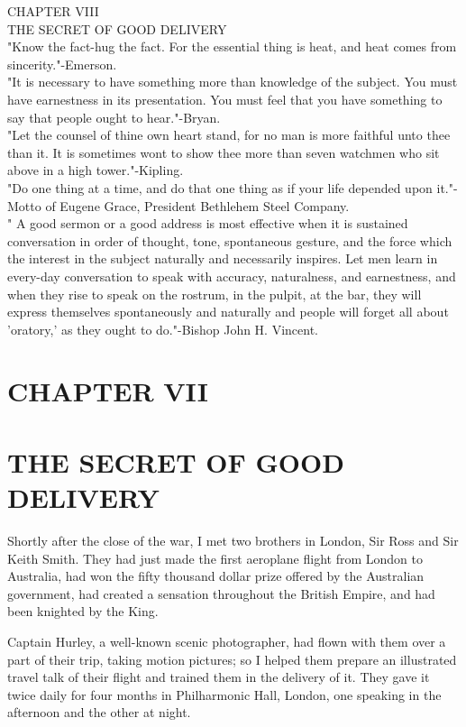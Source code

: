 \documentclass[10pt]{article}
\begin{document}
CHAPTER VIII\\
THE SECRET OF GOOD DELIVERY\\
"Know the fact-hug the fact. For the essential thing is heat, and heat comes from sincerity."-Emerson.\\
"It is necessary to have something more than knowledge of the subject. You must have earnestness in its presentation. You must feel that you have something to say that people ought to hear."-Bryan.\\
"Let the counsel of thine own heart stand, for no man is more faithful unto thee than it. It is sometimes wont to show thee more than seven watchmen who sit above in a high tower."-Kipling.\\
"Do one thing at a time, and do that one thing as if your life depended upon it."-Motto of Eugene Grace, President Bethlehem Steel Company.\\
" A good sermon or a good address is most effective when it is sustained conversation in order of thought, tone, spontaneous gesture, and the force which the interest in the subject naturally and necessarily inspires. Let men learn in every-day conversation to speak with accuracy, naturalness, and earnestness, and when they rise to speak on the rostrum, in the pulpit, at the bar, they will express themselves spontaneously and naturally and people will forget all about 'oratory,' as they ought to do."-Bishop John H. Vincent.

\section*{CHAPTER VII}
\section*{THE SECRET OF GOOD DELIVERY}
Shortly after the close of the war, I met two brothers in London, Sir Ross and Sir Keith Smith. They had just made the first aeroplane flight from London to Australia, had won the fifty thousand dollar prize offered by the Australian government, had created a sensation throughout the British Empire, and had been knighted by the King.

Captain Hurley, a well-known scenic photographer, had flown with them over a part of their trip, taking motion pictures; so I helped them prepare an illustrated travel talk of their flight and trained them in the delivery of it. They gave it twice daily for four months in Philharmonic Hall, London, one speaking in the afternoon and the other at night.
\end{document}
